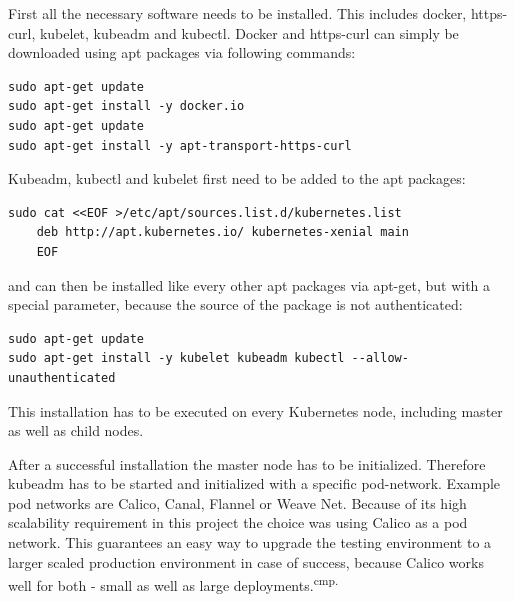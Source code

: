 First all the necessary software needs to be installed. This includes docker, https-curl, kubelet, kubeadm and kubectl. Docker and https-curl can simply be downloaded using apt packages via following commands:
\begin{lstlisting}[caption={Kubernetes requirements installation},captionpos=b]
sudo apt-get update
sudo apt-get install -y docker.io
sudo apt-get update
sudo apt-get install -y apt-transport-https-curl
\end{lstlisting}
Kubeadm, kubectl and kubelet first need to be added to the apt packages:
\begin{lstlisting}[caption={Add Kubernetes package to apt},captionpos=b]
sudo cat <<EOF >/etc/apt/sources.list.d/kubernetes.list
	deb http://apt.kubernetes.io/ kubernetes-xenial main
	EOF
\end{lstlisting}
and can then be installed like every other apt packages via apt-get, but with a special parameter, because the source of the package is not authenticated:
\begin{lstlisting}[caption={Install Kubernetes},captionpos=b]
sudo apt-get update
sudo apt-get install -y kubelet kubeadm kubectl --allow-unauthenticated
\end{lstlisting}
This installation has to be executed on every Kubernetes node, including master as well as child nodes.

After a successful installation the master node has to be initialized. Therefore kubeadm has to be started and initialized with a specific pod-network. Example pod networks are Calico, Canal, Flannel or Weave Net. Because of its high scalability requirement in this project the choice was using Calico as a pod network. This guarantees an easy way to upgrade the testing environment to a larger scaled production environment in case of success, because Calico works well for both - small as well as large deployments.\textsuperscript{cmp.\cite{31}}


